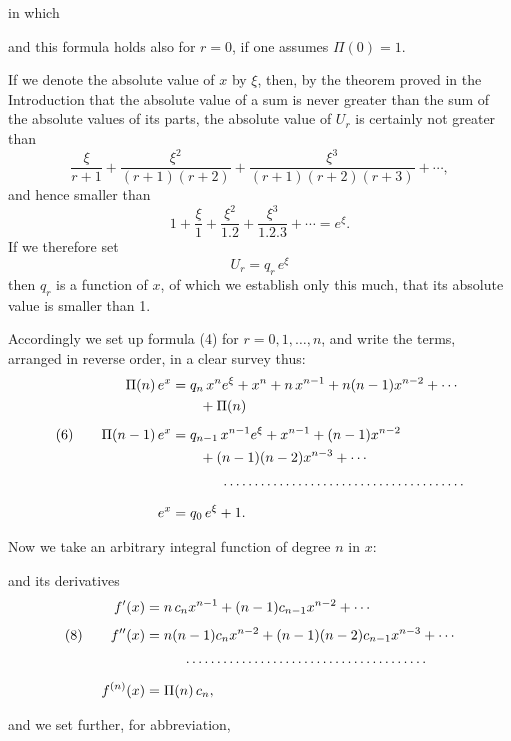 in which


and this formula holds also for $r=0$, if one assumes $\Pi(0)=1$.

If we denote the absolute value of $x$ by $\xi$, then, by the theorem proved in the Introduction that the absolute value of a sum is never greater than the sum of the absolute values of its parts, the absolute value of $U_r$ is certainly not greater than
\[
\frac{\xi}{r+1}+\frac{\xi^2}{(r+1)(r+2)}+\frac{\xi^3}{(r+1)(r+2)(r+3)}+\cdots,
\]
and hence smaller than
\[
1+\frac{\xi}{1}+\frac{\xi^2}{1.2}+\frac{\xi^3}{1.2.3}+\cdots=e^{\xi}.
\]
If we therefore set
\[
U_r = q_r\,e^{\xi}
\]
then $q_r$ is a function of $x$, of which we establish only this much, that its absolute value is smaller than 1.

Accordingly we set up formula (4) for $r=0,1,\ldots,n$, and write the terms, arranged in reverse order, in a clear survey thus:
\[
\begin{aligned}
\Pi(n)\,e^x &= q_n\,x^n e^{\xi} + x^n + n\,x^{n-1} + n(n-1)x^{n-2}+\cdots\\
&\qquad{}+\Pi(n)\\[4pt]
(6)\qquad \Pi(n-1)\,e^x &= q_{n-1}\,x^{n-1}e^{\xi}+x^{n-1}+(n-1)x^{n-2}\\
&\qquad{}+(n-1)(n-2)x^{n-3}+\cdots\\[4pt]
&\hphantom{\Pi(n)\,e^x{}}\;\cdots\cdots\cdots\cdots\cdots\cdots\cdots\cdots\cdots\cdots\cdots\cdots\cdots\\[4pt]
e^x &= q_0\,e^{\xi}+1.
\end{aligned}
\]

Now we take an arbitrary integral function of degree $n$ in $x$:


and its derivatives
\[
\begin{aligned}
f'(x) &= n\,c_n x^{n-1} + (n-1)c_{n-1}x^{n-2}+\cdots\\[4pt]
(8)\qquad f''(x) &= n(n-1)c_n x^{n-2}+(n-1)(n-2)c_{n-1}x^{n-3}+\cdots\\[4pt]
&\hphantom{f''(x){}}\;\cdots\cdots\cdots\cdots\cdots\cdots\cdots\cdots\cdots\cdots\cdots\cdots\cdots\\[4pt]
f^{(n)}(x) &= \Pi(n)\,c_n,
\end{aligned}
\]

and we set further, for abbreviation,

